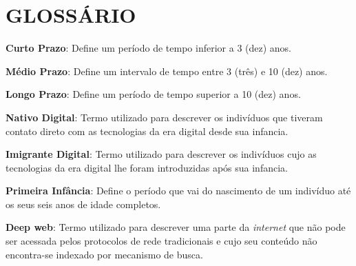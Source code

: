 






\chapter*{GLOSSÁRIO}

{ \setlength{\parindent}{0pt} %




\textbf{Curto Prazo}: Define um período de tempo inferior a 3 (dez) anos. 

\textbf{Médio Prazo}: Define um intervalo de tempo entre 3 (três) e 10 (dez) anos. 

\textbf{Longo Prazo}: Define um período de tempo superior a 10 (dez) anos. 


\textbf{Nativo Digital}: Termo utilizado para descrever os indivíduos que tiveram contato direto com as tecnologias da era digital desde sua infancia. 

\textbf{Imigrante Digital}: Termo utilizado para descrever os indivíduos cujo as tecnologias da era digital lhe foram introduzidas após sua infancia. 

\textbf{Primeira Infância}: Define o período que vai do nascimento de um indivíduo até os seus seis anos de idade completos.

\textbf{Deep web}: Termo utilizado para descrever uma parte da \textit{internet} que não pode ser acessada pelos protocolos de rede tradicionais e cujo seu conteúdo não encontra-se indexado por mecanismo de busca. 

}
